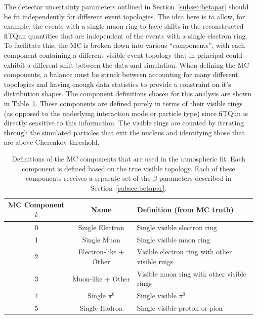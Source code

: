 The detector uncertainty parameters outlined in Section~\ref{subsec:betapar}
should be fit independently for different event topologies. The idea here is to
allow, for example, the events with a single muon ring to have shifts in the
reconstructed fiTQun quantities that are independent of the events with a
single electron ring.  To facilitate this, the MC is broken down into various
``components'', with each component containing a different visible event
topology that in principal could exhibit a different shift between the data and
simulation.  When defining the MC components, a balance must be struck between
accounting for many different topologies and having enough data statistics to
provide a constraint on it's distribution shapes.  The component definitions
chosen for this analysis are shown in Table~\ref{tab:components}.  These
components are defined purely in terms of their visible rings (as opposed to
the underlying interaction mode or particle type) since fiTQun is directly
sensitive to this information.  The visible rings are counted by iterating
through the simulated particles that exit the nucleus and identifying those
that are above Cherenkov threshold.

\begin{table}
  \centering
  \begin{tabular}{c | c | l }
    \hline\hline
    MC Component $k$ & Name & Definition (from MC truth) \\
    \hline
    0 & Single Electron & Single visible electron ring \\
    1 & Single Muon & Single visible muon ring  \\
    2 & Electron-like + Other & Visible electron ring with other visible rings  \\
    3 & Muon-like + Other & Visible muon ring with other visible rings  \\
    4 & Single $\pi^{0}$ & Single visible $\pi^{0}$  \\
    5 & Single Hadron &Single visible proton or pion  \\
    \hline\hline
  \end{tabular}
  \caption{Definitions of the MC components that are used in the atmospheric
  fit.  Each component is defined based on the true visible topology. Each of these
  components receives a separate set of the $\beta$ parameters described in
  Section~\ref{subsec:betapar}. }
  \label{tab:components}
\end{table}



